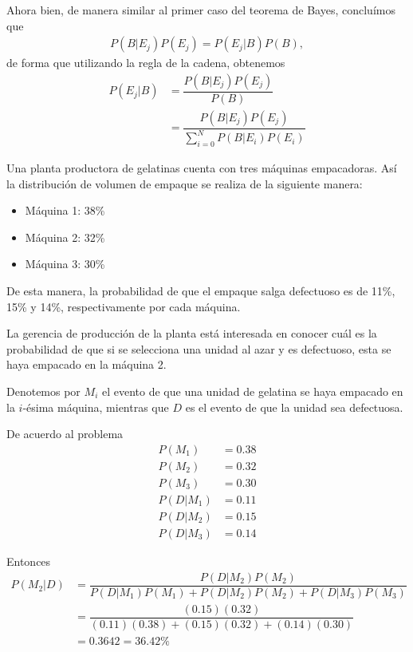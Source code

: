 Ahora bien, de manera similar al primer caso del teorema de Bayes, concluímos que 
\begin{align}
	P(B|E_j)P(E_j)= P(E_j|B)P(B),
\end{align}
de forma que utilizando la regla de la cadena, obtenemos
\begin{align}
	P(E_j|B)&= \dfrac{P(B|E_j)P(E_j)}{P(B)}\\
	&=\dfrac{P(B|E_j)P(E_j)}{\sum_{i=0}^{N} P(B|E_i)P(E_i)}
\end{align}

\begin{ejemplo}
	Una planta productora de gelatinas cuenta con tres máquinas empacadoras. Así la distribución de volumen de empaque se realiza de la siguiente manera:
	\begin{itemize}
		\item Máquina 1: 38\%
		\item Máquina 2: 32\%
		\item Máquina 3: 30\%
	\end{itemize}
	
	De esta manera, la probabilidad de que el empaque salga defectuoso es de 11\%, 15\% y 14\%, respectivamente por cada máquina. 
	
	La gerencia de producción de la planta está interesada en conocer cuál es la probabilidad de que si se selecciona una unidad al azar y es defectuoso, esta se haya empacado en la máquina 2. 

	Denotemos por $ M_i $ el evento de que una unidad de gelatina se haya empacado en la $ i $-ésima máquina, mientras que $ D $ es el evento de que la unidad sea defectuosa. 
	
	De acuerdo al problema 
	\begin{align}
		P(M_1)&=0.38\\
		P(M_2)&=0.32\\
		P(M_3)&=0.30\\
		P(D|M_1)&=0.11\\
		P(D|M_2)&=0.15\\
		P(D|M_3)&=0.14
	\end{align}
	
	Entonces 
	\begin{align}
		P(M_2|D) &= \dfrac{P(D|M_2)P(M_2)}{	P(D|M_1)P(M_1)+P(D|M_2)P(M_2)+P(D|M_3)P(M_3)
		}\\
		&= \dfrac{(0.15)(0.32)}{
			(0.11)(0.38)+(0.15)(0.32)+(0.14)(0.30)	
		}\\
		&=0.3642=36.42\%
	\end{align}
\end{ejemplo}